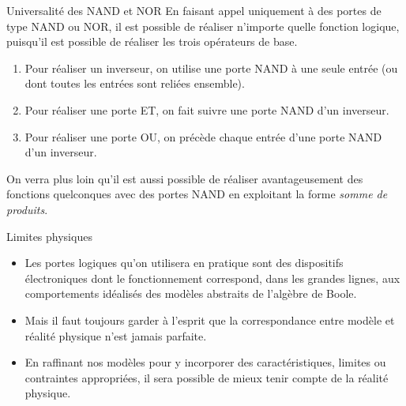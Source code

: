\documentclass[presentation]{beamer}
\begin{document}
\begin{frame}[label={sec:org5845d32}]{Universalité des NAND et NOR}
En faisant appel uniquement à des portes de type NAND ou NOR, il est possible de réaliser n'importe quelle fonction logique, puisqu'il est possible de réaliser les trois opérateurs de base.

\begin{enumerate}
\item Pour réaliser un inverseur, on utilise une porte NAND à une seule entrée (ou dont toutes les entrées sont reliées ensemble).
\item Pour réaliser une porte ET, on fait suivre une porte NAND d'un inverseur.
\item Pour réaliser une porte OU, on précède chaque entrée d'une porte NAND d'un inverseur.
\end{enumerate}

On verra plus loin qu'il est aussi possible de réaliser avantageusement des fonctions quelconques avec des portes NAND en exploitant la forme \emph{somme de produits}.
\end{frame}

\begin{frame}[label={sec:org22860c2}]{Limites physiques}
\begin{itemize}
\item Les portes logiques qu'on utilisera en pratique sont des dispositifs électroniques dont le fonctionnement correspond, dans les grandes lignes, aux comportements idéalisés des modèles abstraits de l'algèbre de Boole.

\item Mais il faut toujours garder à l'esprit que la correspondance entre modèle et réalité physique n'est jamais parfaite.

\item En raffinant nos modèles pour y incorporer des caractéristiques, limites ou contraintes appropriées, il sera possible de mieux tenir compte de la réalité physique.
\end{itemize}
\end{frame}
\end{document}
